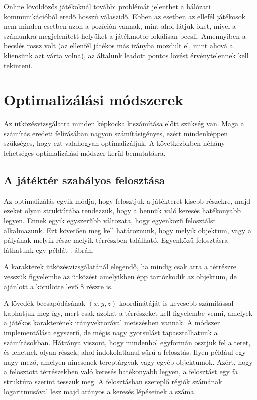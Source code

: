 Online lövöldözős játékoknál további problémát jelenthet a hálózati kommunikációból eredő hosszú válaszidő. Ebben az esetben az ellefél játékosok nem minden esetben azon a pozíción vannak, mint ahol látjuk őket, mivel a számunkra megjelenített helyüket a játékmotor lokálisan becsli. Amennyiben a becslés rossz volt (az ellenfél játékos más irányba mozdult el, mint ahová a kliensünk azt várta volna), az általunk leadott pontos lövést érvénytelennek kell tekinteni.

\section{Optimalizálási módszerek}

Az ütközésvizsgálatra minden képkocka kiszámítása előtt szükség van. Maga a számítás eredeti felírásában nagyon számításigényes, ezért mindenképpen szükséges, hogy ezt valahogyan optimalizáljuk. A következőkben néhány lehetséges optimalizálási módszer kerül bemutatásra.

\subsection{A játéktér szabályos felosztása}

Az optimalizálás egyik módja, hogy felosztjuk a játékteret kisebb részekre, majd ezeket olyan struktúrába rendezzük, hogy a bennük való keresés hatékonyabb legyen. Ennek egyik egyszerűbb változata, hogy egyenközű felosztálst alkalmazunk. Ezt követően meg kell határoznunk, hogy melyik objektum, vagy a pályának melyik része melyik térrészben található. Egyenközű felosztásra láthatunk egy példát . ábrán.

A karakterek ütközésvizsgálatánál elegendő, ha mindig csak arra a térrészre vesszük figyelembe az ütközést amelyikben épp tartózkodik az objektum, de ajánlott a körülötte levő 8 részre is.

A lövedék becsapódásának $(x, y, z)$ koordinátáját is kevesebb számítással kaphatjuk meg így, mert csak azokat a térrészeket kell figyelembe venni, amelyek a játékos karakterének irányvektorával metszésben vannak. A módszer implementálása egyszerű, de mégis nagy gyorsulást tapasztalhatunk a számításokban. Hátránya viszont, hogy mindenhol egyformán osztjuk fel a teret, és lehetnek olyan részek, ahol indokolatlanul sűrű a felosztás. Ilyen például egy nagy mező, amelyen nincsenek tereptárgyak vagy egyéb objektumok. Azért, hogy a felosztott térrészekben való keresés hatékonyabb legyen, a felosztást egy fa struktúra szerint tesszük meg. A felosztásban szereplő régiók számának logaritmusával lesz majd arányos a keresés lépéseinek a száma.

